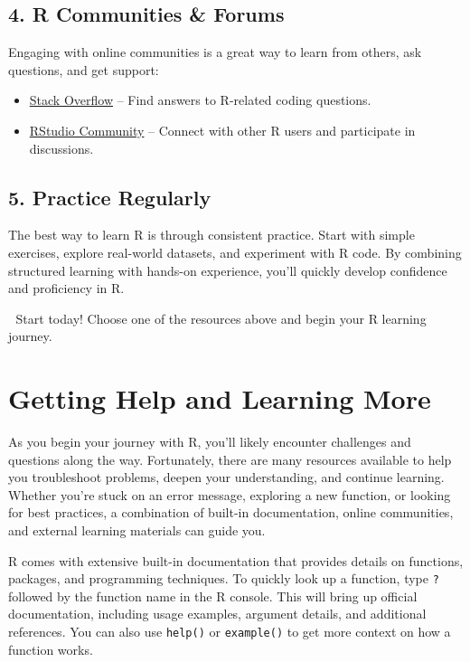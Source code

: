 \documentclass[
]{book}
\newcommand{\passthrough}[1]{#1}
\providecommand{\tightlist}{%
  \setlength{\itemsep}{0pt}\setlength{\parskip}{0pt}}
\theoremstyle{definition}
\theoremstyle{definition}
\theoremstyle{definition}
\theoremstyle{definition}
\theoremstyle{remark}
\begin{document}
\subsection*{4. R Communities \& Forums}\label{r-communities-forums}

Engaging with online communities is a great way to learn from others, ask questions, and get support:

\begin{itemize}
\tightlist
\item
  \href{https://stackoverflow.com/questions/tagged/r}{Stack Overflow} -- Find answers to R-related coding questions.\\
\item
  \href{https://community.rstudio.com/}{RStudio Community} -- Connect with other R users and participate in discussions.
\end{itemize}

\subsection*{5. Practice Regularly}\label{practice-regularly}

The best way to learn R is through consistent practice. Start with simple exercises, explore real-world datasets, and experiment with R code. By combining structured learning with hands-on experience, you'll quickly develop confidence and proficiency in R.

🚀 Start today! Choose one of the resources above and begin your R learning journey.

\section{Getting Help and Learning More}\label{getting-help-and-learning-more}

As you begin your journey with R, you'll likely encounter challenges and questions along the way. Fortunately, there are many resources available to help you troubleshoot problems, deepen your understanding, and continue learning. Whether you're stuck on an error message, exploring a new function, or looking for best practices, a combination of built-in documentation, online communities, and external learning materials can guide you.

R comes with extensive built-in documentation that provides details on functions, packages, and programming techniques. To quickly look up a function, type \passthrough{\lstinline!?!} followed by the function name in the R console. This will bring up official documentation, including usage examples, argument details, and additional references. You can also use \passthrough{\lstinline!help()!} or \passthrough{\lstinline!example()!} to get more context on how a function works.
\end{document}
